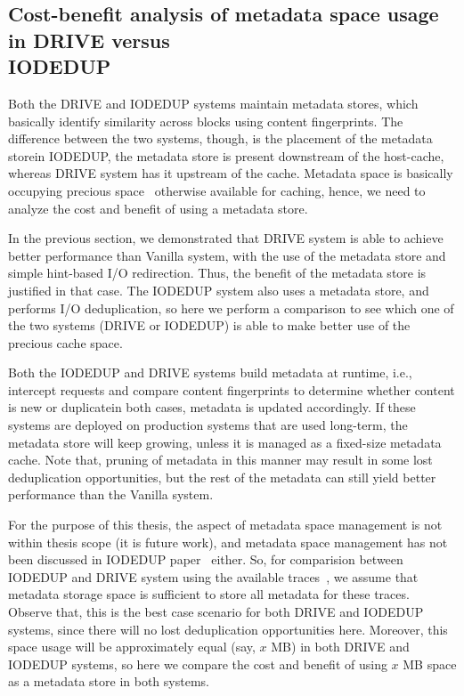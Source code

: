 %

\subsection{Cost-benefit analysis of metadata space usage in DRIVE versus \\IODEDUP}
Both the DRIVE and IODEDUP systems maintain metadata stores, which 
basically identify similarity across blocks using content fingerprints.
The difference between the two systems, though, is the placement of
the metadata store\textemdash{}in IODEDUP, the metadata store is present downstream
of the host-cache, whereas DRIVE system has it upstream of the cache.
Metadata space is basically occupying precious space~\cite{idedup} otherwise 
available for caching, hence, we need to analyze the cost
and benefit of using a metadata store. 

In the previous section, we demonstrated that DRIVE system is able
to achieve better performance than Vanilla system, with the use of the
metadata store and simple hint-based I/O redirection. Thus, the benefit
of the metadata store is justified in that case.
The IODEDUP system also uses a metadata store, and performs I/O
deduplication, so here we perform a comparison to see which one
of the two systems (DRIVE or IODEDUP) is able to make better use
of the precious cache space. 

Both the IODEDUP and DRIVE systems build metadata at runtime, i.e.,
intercept requests and compare content fingerprints to determine
whether content is new or duplicate\textemdash{}in both cases, metadata 
is updated accordingly. If these systems are deployed on 
production systems that are used long-term, the metadata store
will keep growing, unless it is managed as a fixed-size metadata cache.
Note that, pruning of metadata in this manner may result in some
lost deduplication opportunities, but the rest of the metadata
can still yield better performance than the Vanilla system.

For the purpose of this thesis, the aspect of metadata space 
management is not within thesis scope (it is future work), and
metadata space management has not been discussed in 
IODEDUP paper~\cite{iodedup} either.
So, for comparision between IODEDUP and DRIVE system using the 
available traces~\cite{iodedup-online}, we assume
that metadata storage space is sufficient to store all metadata
for these traces.
Observe that, this is
the best case scenario for both DRIVE and IODEDUP systems,
since there will no lost deduplication opportunities here.
Moreover, this space usage will be approximately equal (say, $x$ MB)
in both DRIVE and IODEDUP systems, so here we compare the cost and 
benefit of using $x$ MB space as a metadata store in both systems.

